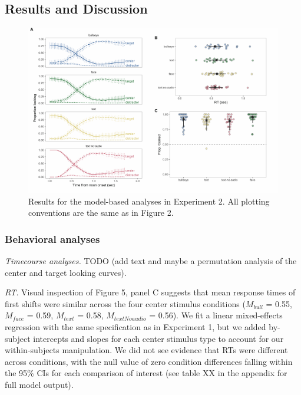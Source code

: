 \documentclass[english,floatsintext,man]{apa6}
\begin{document}
\hypertarget{results-and-discussion-1}{%
\subsection{Results and Discussion}\label{results-and-discussion-1}}

\begin{figure}[!ht]

{\centering \includegraphics[width=0.9\linewidth]{figs/text-plot-1} 

}

\caption{Results for the model-based analyses in Experiment 2. All plotting conventions are the same as in Figure 2.}\label{fig:text-plot}
\end{figure}

\hypertarget{behavioral-analyses-1}{%
\subsubsection{Behavioral analyses}\label{behavioral-analyses-1}}

\emph{Timecourse analyses.} TODO (add text and maybe a permutation
analysis of the center and target looking curves).

\emph{RT.} Visual inspection of Figure 5, panel C suggests that mean
response times of first shifts were similar across the four center
stimulus conditions (\(M_{bull}\) = 0.55, \(M_{face}\) = 0.59,
\(M_{text}\) = 0.58, \(M_{textNoaudio}\) = 0.56). We fit a linear
mixed-effects regression with the same specification as in Experiment 1,
but we added by-subject intercepts and slopes for each center stimulus
type to account for our within-subjects manipulation. We did not see
evidence that RTs were different across conditions, with the null value
of zero condition differences falling within the 95\% CIs for each
comparison of interest (see table XX in the appendix for full model
output).
\end{document}
